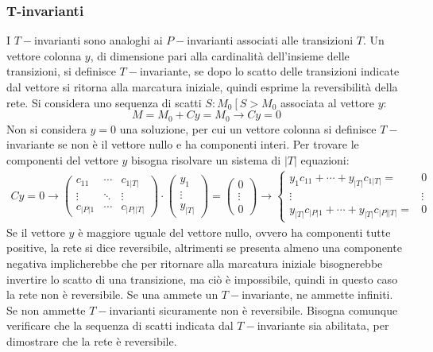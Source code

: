 \documentclass{article}
\numberwithin{equation}{subsection}
\begin{document}
\subsubsection{T-invarianti}

I $T-$invarianti sono analoghi ai $P-$invarianti associati alle transizioni $T$. Un vettore colonna $y$, di dimensione pari alla cardinalità dell'insieme delle transizioni, 
si definisce $T-$invariante, se dopo lo scatto delle transizioni indicate dal vettore si ritorna alla marcatura iniziale, quindi esprime la reversibilità della rete. 
Si considera uno sequenza di scatti $S: M_0\left[\right.S>M_0$ associata al vettore $y$: 
\begin{equation*}
    M=M_0+Cy=M_0\to Cy=0
\end{equation*}
Non si considera $y=0$ una soluzione, per cui un vettore colonna si definisce $T-$invariante se non è il vettore nullo e ha componenti interi. Per trovare 
le componenti del vettore $y$ bisogna risolvare un sistema di $|T|$ equazioni: 
\begin{gather*}
    Cy=0\to
    \begin{pmatrix}
        c_{11} & \cdots & c_{1|T|}\\
        \vdots & \ddots & \vdots\\
        c_{|P|1} & \cdots & c_{|P||T|}
    \end{pmatrix}\cdot
    \begin{pmatrix}
        y_1\\
        \vdots\\
        y_{|T|}
    \end{pmatrix}=
    \begin{pmatrix}
        0\\
        \vdots\\
        0
    \end{pmatrix}\to
    \begin{cases}
        y_1c_{11}+\cdots+y_{|T|}c_{1|T|}=&0\\
        \vdots & \vdots\\
        y_{|T|}c_{|P|1}+\cdots+y_{|T|}c_{|P||T|}=&0
    \end{cases}
\end{gather*}
Se il vettore $y$ è maggiore uguale del vettore nullo, ovvero ha componenti tutte positive, la rete si dice reversibile, altrimenti se presenta almeno una componente negativa 
implicherebbe che per ritornare alla marcatura iniziale bisognerebbe invertire lo scatto di una transizione, ma ciò è impossibile, quindi in questo caso la rete non è 
reversibile. Se una ammete un $T-$invariante, ne ammette infiniti. Se non ammette $T-$invarianti sicuramente non è reversibile. Bisogna comunque verificare che la sequenza di 
scatti indicata dal $T-$invariante sia abilitata, per dimostrare che la rete è reversibile. 
\end{document}
